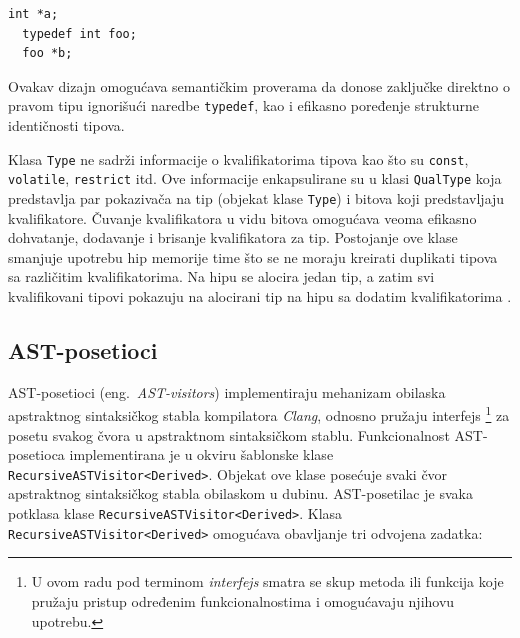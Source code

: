 \documentclass[12pt,oneside]{memoir}
\begin{document}
\begin{lstlisting}[style=customc, caption={Primer kanonskog tipa (\texttt{int *}) i tipa koji nije kanonski (\texttt{foo *}). },label=lst:label5]
  int *a;
  typedef int foo;
  foo *b;
\end{lstlisting}
  Ovakav dizajn omogu\'{c}ava semanti\v{c}kim proverama da donose zaklju\v{c}ke direktno o pravom tipu ignori\v{s}u\'{c}i naredbe \texttt{typedef}, kao i efikasno poređenje strukturne identi\v{c}nosti tipova.

  \par
  Klasa \texttt{Type} ne sadr\v{z}i informacije o kvalifikatorima tipova kao \v{s}to su \texttt{const}, \texttt{volatile}, \texttt{restrict} itd. Ove informacije enkapsulirane su u klasi \texttt{QualType} koja predstavlja par pokaziva\v{c}a na tip (objekat klase \texttt{Type}) i bitova koji predstavljaju
  kvalifikatore. \v{C}uvanje kvalifikatora u vidu bitova omogu\'{c}ava veoma efikasno dohvatanje, dodavanje i brisanje kvalifikatora za tip. Postojanje ove klase smanjuje upotrebu hip memorije time \v{s}to se ne moraju kreirati duplikati tipova sa razli\v{c}itim kvalifikatorima. Na hipu se alocira jedan tip, a zatim 
  svi kvalifikovani tipovi pokazuju na alocirani tip na hipu sa dodatim kvalifikatorima \cite{CFEWebsite}.

\subsection{AST-posetioci}
AST-posetioci (eng.~\textit{AST-visitors}) implementiraju mehanizam obilaska apstraktnog sintaksi\v{c}kog stabla kompilatora \textit{Clang}, odnosno pru\v{z}aju interfejs \footnote{U ovom radu pod terminom \textit{interfejs} smatra se skup metoda ili funkcija koje pru\v{z}aju pristup određenim funkcionalnostima i omogu\'{c}avaju njihovu upotrebu.}
za posetu svakog \v{c}vora u apstraktnom sintaksi\v{c}kom stablu.
Funkcionalnost AST-posetioca implementirana je u okviru šablonske klase  \texttt{RecursiveASTVisitor<Deri\-ved>}.
Objekat ove klase posećuje svaki čvor apstraktnog sintaksi\v{c}kog stabla obilaskom u dubinu.
AST-posetilac je svaka potklasa klase \texttt{RecursiveASTVisitor<Der\-ived>}.
Klasa \texttt{RecursiveASTVisitor<\-Derived>} omogu\'{c}ava obavljanje tri odvojena zadatka:
\end{document}
